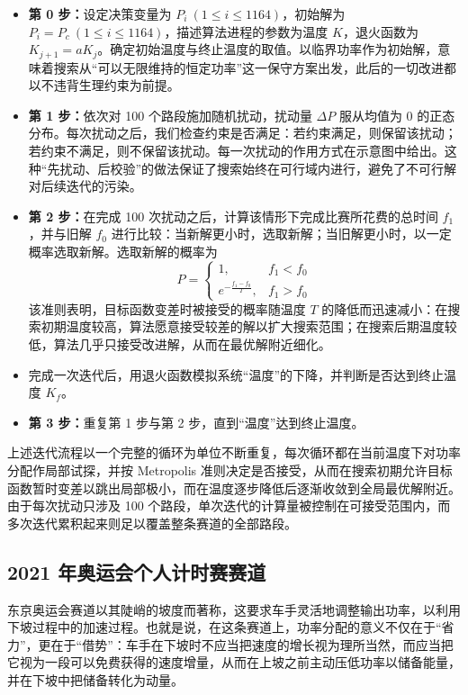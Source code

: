 \documentclass[11pt,a4paper]{ctexart}
\begin{document}
\begin{itemize}
\item \textbf{第 0 步：}设定决策变量为 $P_i\ (1\le i\le 1164)$，初始解为 $P_i=P_c\ (1\le i\le 1164)$，描述算法进程的参数为温度 $K$，退火函数为 $K_{j+1}=aK_j$。确定初始温度与终止温度的取值。以临界功率作为初始解，意味着搜索从“可以无限维持的恒定功率”这一保守方案出发，此后的一切改进都以不违背生理约束为前提。

\item \textbf{第 1 步：}依次对 100 个路段施加随机扰动，扰动量 $\Delta P$ 服从均值为 0 的正态分布。每次扰动之后，我们检查约束是否满足：若约束满足，则保留该扰动；若约束不满足，则不保留该扰动。每一次扰动的作用方式在示意图中给出。这种“先扰动、后校验”的做法保证了搜索始终在可行域内进行，避免了不可行解对后续迭代的污染。

\item \textbf{第 2 步：}在完成 100 次扰动之后，计算该情形下完成比赛所花费的总时间 $f_1$，并与旧解 $f_0$ 进行比较：当新解更小时，选取新解；当旧解更小时，以一定概率选取新解。选取新解的概率为
\[
P=
\begin{cases}
1, & f_1<f_0\\[0.6em]
e^{-\frac{f_1-f_0}{T}}, & f_1>f_0
\end{cases}
\]
该准则表明，目标函数变差时被接受的概率随温度 $T$ 的降低而迅速减小：在搜索初期温度较高，算法愿意接受较差的解以扩大搜索范围；在搜索后期温度较低，算法几乎只接受改进解，从而在最优解附近细化。

\item 完成一次迭代后，用退火函数模拟系统“温度”的下降，并判断是否达到终止温度 $K_f$。

\item \textbf{第 3 步：}重复第 1 步与第 2 步，直到“温度”达到终止温度。
\end{itemize}

上述迭代流程以一个完整的循环为单位不断重复，每次循环都在当前温度下对功率分配作局部试探，并按 Metropolis 准则决定是否接受，从而在搜索初期允许目标函数暂时变差以跳出局部极小，而在温度逐步降低后逐渐收敛到全局最优解附近。由于每次扰动只涉及 100 个路段，单次迭代的计算量被控制在可接受范围内，而多次迭代累积起来则足以覆盖整条赛道的全部路段。
\subsection{2021 年奥运会个人计时赛赛道}

东京奥运会赛道以其陡峭的坡度而著称，这要求车手灵活地调整输出功率，以利用下坡过程中的加速过程。也就是说，在这条赛道上，功率分配的意义不仅在于“省力”，更在于“借势”：车手在下坡时不应当把速度的增长视为理所当然，而应当把它视为一段可以免费获得的速度增量，从而在上坡之前主动压低功率以储备能量，并在下坡中把储备转化为动量。
\end{document}
